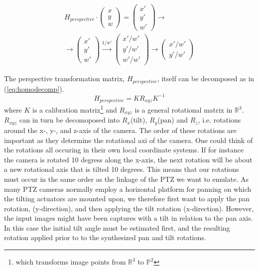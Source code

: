 	\begin{multline}
		H_{perspective}\cdot
		\begin{pmatrix} 
			x \\ 
			y \\ 
			w 
		\end{pmatrix}=
		\begin{pmatrix}
			x' \\ 
			y' \\ 
			w' 
		\end{pmatrix} \rightarrow \\ 
		\rightarrow 
		\begin{pmatrix}
			x' \\ 
			y' \\ 
			w' 
		\end{pmatrix} \xrightarrow{1/w'} 
		\begin{pmatrix}
			x'/w' \\ 
			y'/w' \\ 
			w'/w' 
		\end{pmatrix} \rightarrow 
		\begin{pmatrix} 
			x'/w' \\ 
			y'/w' 
		\end{pmatrix}
		\label{eq:homoapp}
	\end{multline}

	The perspective transformation matrix, $H_{perspective}$, itself can be decomposed as in (\ref{eq:homodecomp}).
	\begin{equation}
		H_{perspective}=KR_{xyz}K^{-1}
		\label{eq:homodecomp}
	\end{equation}
	where $K$ is a calibration matrix\footnote{which transforms image points from $\mathbb{R}^3$ to $\mathbb{P}^2$} and $R_{xyz}$ is a general rotational matrix in $\mathbb{R}^3$.
$R_{xyz}$ can in turn be decomoposed into $R_x$(tilt), $R_y$(pan) and $R_z$, i.e. rotations around the x-, y-, and z-axis of the camera.
The order of these rotations are important as they determine the rotational axi of the camera. 
One could think of the rotations all occuring in their own local coordinate systems. 
If for instance the camera is rotated 10 degress along the x-axis, the next rotation will be about a new rotational axis that is tilted 10 degrees.
This means that our rotations must occur in the same order as the linkage of the PTZ we want to emulate. 
As many PTZ cameras normally employ a horizontal platform for panning on which the tilting actuators are mounted upon, we therefore first want to apply the pan rotation, (y-direction), and then applying the tilt rotation (x-direction).
However, the input images might have been captures with a tilt in relation to the pan axis.
In this case the initial tilt angle must be estimated first, and the resulting rotation applied prior to to the synthesized pan and tilt rotations.

